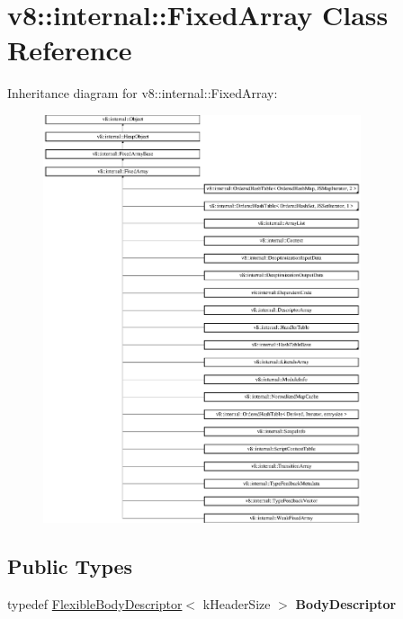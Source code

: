 \hypertarget{classv8_1_1internal_1_1_fixed_array}{}\section{v8\+:\+:internal\+:\+:Fixed\+Array Class Reference}
\label{classv8_1_1internal_1_1_fixed_array}
Inheritance diagram for v8\+:\+:internal\+:\+:Fixed\+Array\+:\begin{figure}[H]
\begin{center}
\leavevmode
\includegraphics[height=12.000000cm]{classv8_1_1internal_1_1_fixed_array}
\end{center}
\end{figure}
\subsection*{Public Types}
\begin{DoxyCompactItemize}
\item 
typedef \hyperlink{classv8_1_1internal_1_1_flexible_body_descriptor}{Flexible\+Body\+Descriptor}$<$ k\+Header\+Size $>$ {\bfseries Body\+Descriptor}\hypertarget{classv8_1_1internal_1_1_fixed_array_a7e3d1190aa4d17df2ee5508b19319050}{}\label{classv8_1_1internal_1_1_fixed_array_a7e3d1190aa4d17df2ee5508b19319050}

\end{DoxyCompactItemize}
